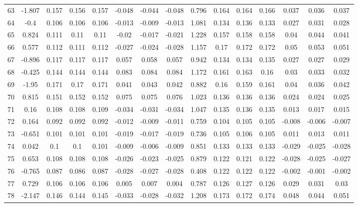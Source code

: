 \begin{table}[H]
{\begin{tabular}{l|c|ccc|ccc|c|ccc|ccc}
			63 & -1.807 & 0.157 & 0.156 & 0.157 & -0.048 & -0.044 & -0.048 & 0.796 & 0.164 & 0.164 & 0.166 & 0.037 & 0.036 & 0.037 \\
			64 & -0.4 & 0.106 & 0.106 & 0.106 & -0.013 & -0.009 & -0.013 & 1.081 & 0.134 & 0.136 & 0.133 & 0.027 & 0.031 & 0.028 \\
			65 & 0.824 & 0.111 & 0.11 & 0.11 & -0.02 & -0.017 & -0.021 & 1.228 & 0.157 & 0.158 & 0.158 & 0.04 & 0.044 & 0.041 \\
			66 & 0.577 & 0.112 & 0.111 & 0.112 & -0.027 & -0.024 & -0.028 & 1.157 & 0.17 & 0.172 & 0.172 & 0.05 & 0.053 & 0.051 \\
			67 & -0.896 & 0.117 & 0.117 & 0.117 & 0.057 & 0.058 & 0.057 & 0.942 & 0.134 & 0.134 & 0.135 & 0.027 & 0.027 & 0.029 \\
			68 & -0.425 & 0.144 & 0.144 & 0.144 & 0.083 & 0.084 & 0.084 & 1.172 & 0.161 & 0.163 & 0.16 & 0.03 & 0.033 & 0.032 \\
			69 & -1.95 & 0.171 & 0.17 & 0.171 & 0.041 & 0.043 & 0.042 & 0.882 & 0.16 & 0.159 & 0.161 & 0.04 & 0.036 & 0.042 \\
			70 & 0.815 & 0.151 & 0.152 & 0.152 & 0.075 & 0.075 & 0.076 & 1.023 & 0.136 & 0.136 & 0.136 & 0.024 & 0.024 & 0.025 \\
			71 & 0.16 & 0.108 & 0.108 & 0.109 & -0.034 & -0.031 & -0.034 & 1.047 & 0.135 & 0.136 & 0.135 & 0.013 & 0.017 & 0.015 \\
			72 & 0.164 & 0.092 & 0.092 & 0.092 & -0.012 & -0.009 & -0.011 & 0.759 & 0.104 & 0.105 & 0.105 & -0.008 & -0.006 & -0.007 \\
			73 & -0.651 & 0.101 & 0.101 & 0.101 & -0.019 & -0.017 & -0.019 & 0.736 & 0.105 & 0.106 & 0.105 & 0.011 & 0.013 & 0.011 \\
			74 & 0.042 & 0.1 & 0.1 & 0.101 & -0.009 & -0.006 & -0.009 & 0.851 & 0.133 & 0.133 & 0.133 & -0.029 & -0.025 & -0.028 \\
			75 & 0.653 & 0.108 & 0.108 & 0.108 & -0.026 & -0.023 & -0.025 & 0.879 & 0.122 & 0.121 & 0.122 & -0.028 & -0.025 & -0.027 \\
			76 & -0.765 & 0.087 & 0.086 & 0.087 & -0.028 & -0.027 & -0.028 & 0.408 & 0.122 & 0.122 & 0.122 & -0.002 & -0.001 & -0.002 \\
			77 & 0.729 & 0.106 & 0.106 & 0.106 & 0.005 & 0.007 & 0.004 & 0.787 & 0.126 & 0.127 & 0.126 & 0.029 & 0.031 & 0.03 \\
			78 & -2.147 & 0.146 & 0.144 & 0.145 & -0.033 & -0.028 & -0.032 & 1.208 & 0.173 & 0.172 & 0.174 & 0.048 & 0.044 & 0.051 \\

\end{tabular}}
\end{table}
